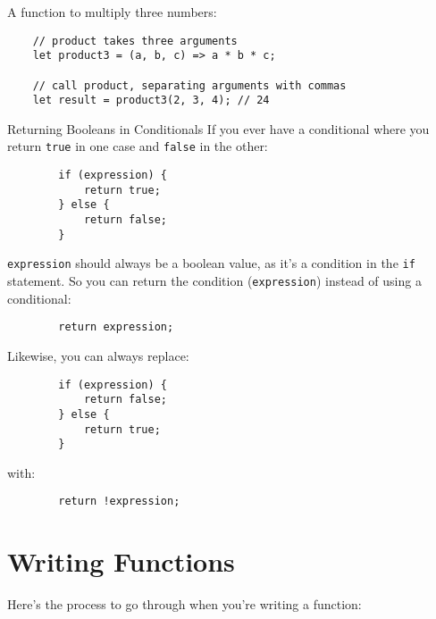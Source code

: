 A function to multiply three numbers:

\begin{verbatim}
    // product takes three arguments
    let product3 = (a, b, c) => a * b * c;

    // call product, separating arguments with commas
    let result = product3(2, 3, 4); // 24
\end{verbatim}

\pagebreak

\begin{infobox}{Returning Booleans in Conditionals}
    If you ever have a conditional where you return \texttt{true} in one case and \texttt{false} in the other:

    \begin{verbatim}
        if (expression) {
            return true;
        } else {
            return false;
        }
    \end{verbatim}

    \texttt{expression} should always be a boolean value, as it's a condition in the \texttt{if} statement. So you can return the condition (\texttt{expression}) instead of using a conditional:

    \begin{verbatim}
        return expression;
    \end{verbatim}

    Likewise, you can always replace:

    \begin{verbatim}
        if (expression) {
            return false;
        } else {
            return true;
        }
    \end{verbatim}

    with:

    \begin{verbatim}
        return !expression;
    \end{verbatim}

\end{infobox}

\pagebreak

\section{Writing Functions}

Here's the process to go through when you're writing a function:

